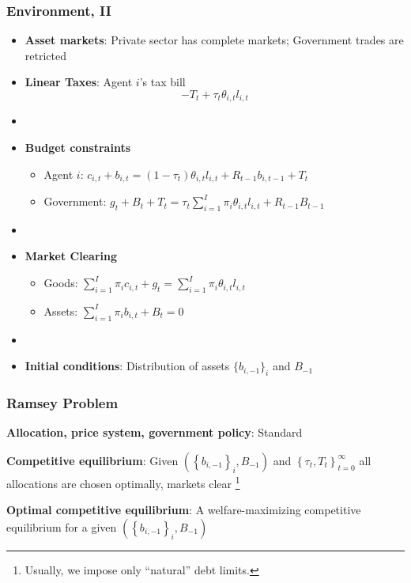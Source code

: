 \documentclass{beamer}
\begin{document}
\begin{frame}
 \frametitle{Environment, II}
 \begin{itemize}
\item \textbf{Asset markets}: Private sector has complete markets; Government trades are retricted
  \item \textbf{Linear Taxes}: Agent $i$'s tax bill
\[- T_t + \tau_t \theta_{i,t}l_{i,t}\]

\item[]
  \item \textbf{Budget constraints}
  \begin{itemize}
   \item Agent $i$: $ c_{i,t}+b_{i,t}=\left( 1-\tau _{t}\right) \theta _{i,t}l_{i,t}+R_{t-1}b_{i,t-1}+T_{t}$
\item Government: $g_{t}+B_{t}+T_t=\tau _{t}\sum_{i=1}^{I}\pi _{i}\theta_{i,t}l_{i,t}+R_{t-1}B_{t-1}$
  \end{itemize}

\item[]
  \item \textbf{Market Clearing}
  \begin{itemize}
   \item Goods: $\sum_{i=1}^{I}\pi_{i}c_{i,t}+g_t =\sum_{i=1}^{I}\pi
_{i}\theta _{i,t} l_{i,t}$

   \item Assets: $\sum_{i=1}^{I}\pi _{i}b_{i,t}+B_{t}=0$
\end{itemize}
  \item[]

\item \textbf{Initial conditions}: Distribution of assets $\{b_{i,-1}\}_i$ and $B_{-1}$
\end{itemize}

\end{frame}


\begin{frame}
 \frametitle{Ramsey Problem}

\begin{definition}
\textbf{Allocation, price system, government policy}: Standard

\end{definition}

\begin{definition}
\textbf{Competitive equilibrium}: Given $\left( \left\{ b_{i,-1}\right\}
_{i},B_{-1}\right) $ and $\left\{ \tau _{t},T_{t}\right\} _{t=0}^{\infty }$
all allocations are chosen optimally, markets clear \footnote{Usually, we impose only  ``natural'' debt limits. }
\end{definition}

\begin{definition}
\textbf{Optimal competitive equilibrium}: A welfare-maximizing competitive
equilibrium for a given $\left( \left\{ b_{i,-1}\right\} _{i},B_{-1}\right) $
\end{definition}

 \end{frame}
 
\end{document}
